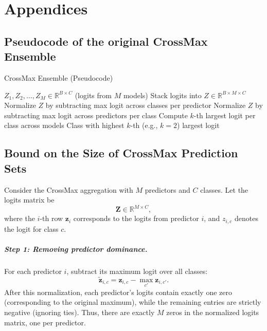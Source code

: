 
\chapter*{Appendices}  
\renewcommand{\thesection}{\Alph{section}} 

\section{Pseudocode of the original CrossMax Ensemble}
\label{alg:crossmax}
\begin{algorithm}
\caption{CrossMax Ensemble (Pseudocode)~\cite{fort2024ensemble}}
\begin{algorithmic}
\Require $Z_1, Z_2, \dots, Z_M \in \mathbb{R}^{B \times C}$ (logits from $M$ models)
\State Stack logits into $Z \in \mathbb{R}^{B \times M \times C}$
\State Normalize $Z$ by subtracting max logit across classes per predictor
\State Normalize $Z$ by subtracting max logit across predictors per class
\State Compute $k$-th largest logit per class across models
\Ensure Class with highest $k$-th (e.g., $k=2$) largest logit
\end{algorithmic}
\end{algorithm}


\section{Bound on the Size of CrossMax Prediction Sets}
\label{appendix:crossmax-bound}

Consider the CrossMax aggregation with $M$ predictors and $C$ classes.  
Let the logits matrix be
\[
\mathbf{Z} \in \mathbb{R}^{M \times C},
\]
where the $i$-th row $\mathbf{z}_i$ corresponds to the logits from predictor $i$, and $z_{i,c}$ denotes the logit for class $c$.

\paragraph{Step 1: Removing predictor dominance.}  
For each predictor $i$, subtract its maximum logit over all classes:
\[
\tilde{\mathbf{z}}_{i,c} = \mathbf{z}_{i,c} - \max_{c'} \mathbf{z}_{i,c'}.
\]
After this normalization, each predictor’s logits contain exactly one zero (corresponding to the original maximum), while the remaining entries are strictly negative (ignoring ties). Thus, there are exactly $M$ zeros in the normalized logits matrix, one per predictor.

